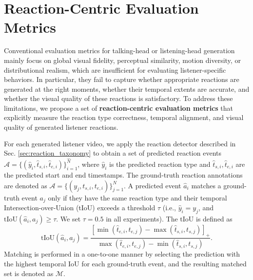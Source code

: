 \vspace{-0.5em}
\section{Reaction-Centric Evaluation Metrics} \label{sec:metric}
\vspace{-0.5em}

Conventional evaluation metrics for talking-head or listening-head generation mainly focus on global visual fidelity, perceptual similarity, motion diversity, or distributional realism, which are insufficient for evaluating listener-specific behaviors. In particular, they fail to capture whether appropriate reactions are generated at the right moments, whether their temporal extents are accurate, and whether the visual quality of these reactions is satisfactory. To address these limitations, we propose a set of \textbf{reaction-centric evaluation metrics} that explicitly measure the reaction type correctness, temporal alignment, and visual quality of generated listener reactions.

For each generated listener video, we apply the reaction detector described in Sec. \ref{sec:reaction_taxonomy} to obtain a set of predicted reaction events $\widehat{\mathcal{A}}=\{(\widehat{y}_i,\widehat{t}_{s,i},\widehat{t}_{e,i})\}_{i=1}^{\widehat{N}}$, where $\widehat{y}_i$ is the predicted reaction type and $\widehat{t}_{s,i},\widehat{t}_{e,i}$ are the predicted start and end timestamps. The ground-truth reaction annotations are denoted as $\mathcal{A}=\{(y_j,t_{s,i},t_{e,i})\}_{j=1}^{N}$. A predicted event $\widehat{a}_i$ matches a ground-truth event $a_j$ only if they have the same reaction type and their temporal Intersection-over-Union (tIoU) exceeds a threshold $\tau$ (i.e., $\widehat{y}_i=y_j$, and $\mathrm{tIoU}(\widehat{a}_i,a_j)\geq\tau$. We set $\tau=0.5$ in all experiments). The tIoU is defined as
{
\footnotesize
\begin{equation}
    \text{tIoU}(\widehat{a}_i,a_j)=
    \frac{\left[\min(\widehat{t}_{e,i},t_{e,j})-\max(\widehat{t}_{s,i},t_{s,j})\right]_+}
    {\max(\widehat{t}_{e,i},t_{e,j})-\min(\widehat{t}_{s,i},t_{s,j})}.
\end{equation}
}Matching is performed in a one-to-one manner by selecting the prediction with the highest temporal IoU for each ground-truth event, and the resulting matched set is denoted as $\mathcal{M}$.







